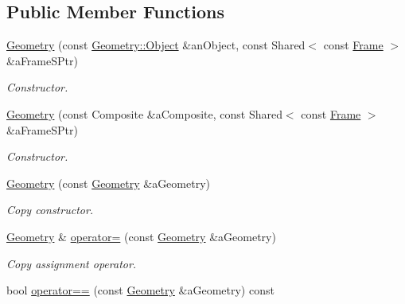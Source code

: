 \subsection*{Public Member Functions}
\begin{DoxyCompactItemize}
\item 
\hyperlink{classlibrary_1_1physics_1_1env_1_1object_1_1_geometry_a150ec4f85fe2c76471833df4145b96e8}{Geometry} (const \hyperlink{classlibrary_1_1physics_1_1env_1_1object_1_1_geometry_a4889a934df09768235fa2d89d0b0b0d6}{Geometry\+::\+Object} \&an\+Object, const Shared$<$ const \hyperlink{classlibrary_1_1physics_1_1coord_1_1_frame}{Frame} $>$ \&a\+Frame\+S\+Ptr)
\begin{DoxyCompactList}\small\item\em Constructor. \end{DoxyCompactList}\item 
\hyperlink{classlibrary_1_1physics_1_1env_1_1object_1_1_geometry_a66d7f144c0dba376b52dc37b417691ef}{Geometry} (const Composite \&a\+Composite, const Shared$<$ const \hyperlink{classlibrary_1_1physics_1_1coord_1_1_frame}{Frame} $>$ \&a\+Frame\+S\+Ptr)
\begin{DoxyCompactList}\small\item\em Constructor. \end{DoxyCompactList}\item 
\hyperlink{classlibrary_1_1physics_1_1env_1_1object_1_1_geometry_ae686db5e0a555caf7636596a4b96495c}{Geometry} (const \hyperlink{classlibrary_1_1physics_1_1env_1_1object_1_1_geometry}{Geometry} \&a\+Geometry)
\begin{DoxyCompactList}\small\item\em Copy constructor. \end{DoxyCompactList}\item 
\hyperlink{classlibrary_1_1physics_1_1env_1_1object_1_1_geometry}{Geometry} \& \hyperlink{classlibrary_1_1physics_1_1env_1_1object_1_1_geometry_ac2c0d8cbdf9a6828fdd05024fc6ddad7}{operator=} (const \hyperlink{classlibrary_1_1physics_1_1env_1_1object_1_1_geometry}{Geometry} \&a\+Geometry)
\begin{DoxyCompactList}\small\item\em Copy assignment operator. \end{DoxyCompactList}\item 
bool \hyperlink{classlibrary_1_1physics_1_1env_1_1object_1_1_geometry_a30698963aff142ce94be27205e4ace24}{operator==} (const \hyperlink{classlibrary_1_1physics_1_1env_1_1object_1_1_geometry}{Geometry} \&a\+Geometry) const

\end{DoxyCompactItemize}
